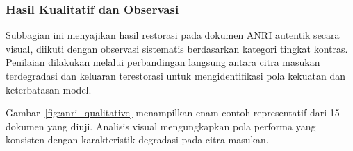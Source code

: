 \documentclass[12pt,a4paper]{article}
\begin{document}
\subsubsection{Hasil Kualitatif dan Observasi}
\label{subsubsec:anri-hasil-observasi}

Subbagian ini menyajikan hasil restorasi pada dokumen ANRI autentik secara visual, diikuti dengan observasi sistematis berdasarkan kategori tingkat kontras. Penilaian dilakukan melalui perbandingan langsung antara citra masukan terdegradasi dan keluaran terestorasi untuk mengidentifikasi pola kekuatan dan keterbatasan model.

Gambar~\ref{fig:anri_qualitative} menampilkan enam contoh representatif dari 15 dokumen yang diuji. Analisis visual mengungkapkan pola performa yang konsisten dengan karakteristik degradasi pada citra masukan.
\end{document}

